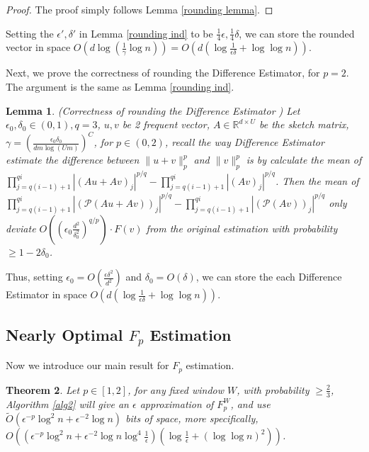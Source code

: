 \documentclass{article}
\newcommand{\dif}{\textsf{Difference Estimator }}
\newcommand{\diff}{\textsf{Difference Estimator}}
\theoremstyle{plain}
\newtheorem{theorem}{Theorem}[section]
\newtheorem{lem}[theorem]{Lemma}
\begin{document}
\begin{proof}
    The proof simply follows Lemma \ref{rounding lemma}.
\end{proof}

Setting the $\epsilon', \delta'$ in Lemma \ref{rounding ind} to be $\frac 14 \epsilon, \frac 14 \delta$, we can store the rounded vector in space $O(d \log (\frac 1\gamma \log n)) = O(d (\log \frac{1}{\epsilon \delta} + \log\log n))$. 

Next, we prove the correctness of rounding the \diff, for $p = 2$. The argument is the same as Lemma \ref{rounding ind}. 

\begin{lem}(Correctness of rounding the \dif) \label{rounding dif}
 Let $\epsilon_0, \delta_0 \in (0, 1), q = 3$, $u, v$ be 2 frequent vector, $A \in \mathbb{R} ^ {d\times U}$ be the sketch matrix, $\gamma = (\frac{\epsilon_0  \delta_0}{dm \log (Um)}) ^ C$, for $p \in (0, 2)$, recall the way \dif estimate the difference between $\|u+v\|_p ^ p$ and $\|v\|_p ^ p$ is by calculate the mean of $\prod_{j=  q(i-1) + 1} ^ {qi} |(Au+Av)_j| ^ {p/q} - \prod_{j=  q(i-1) + 1} ^ {qi} |(Av)_j| ^ {p/q}$.  Then the mean of $\prod_{j=  q(i-1) + 1} ^ {qi} |(\mathcal{P}(Au+Av))_j| ^ {p/q} - \prod_{j=  q(i-1) + 1} ^ {qi} |(\mathcal{P}(Av))_j| ^ {p/q}$ only deviate $O((\epsilon_0 \frac{d ^ 2}{\delta_0 ^ 2}) ^ {q/p})\cdot F(v)$ from the original estimation with probability $\ge 1 - 2\delta_0$. 
    
\end{lem}

Thus, setting $\epsilon_0 = O(\frac{\epsilon \delta ^ 2}{d ^ 2})$ and $\delta_0 = O(\delta)$, we can store the each \dif in space $O(d (\log \frac {1}{\epsilon\delta} + \log\log n))$.  \subsection{Nearly Optimal $F_p$ Estimation}

 
Now we introduce our main result for $F_p$ estimation.

\begin{theorem}\label{main est}
    Let $p\in [1, 2]$, for any fixed window $W$, with probability $\ge \frac 23$, Algorithm \ref{alg2} will give an $\epsilon$ approximation of $F_p ^ {W}$, and  use $\tilde{O}(\epsilon ^ {-p}\log ^ 2n + \epsilon ^ {-2} \log n)$ bits of space, more specifically, $O((\epsilon ^ {-p} \log ^ 2n + \epsilon ^ {-2}\log n \log ^ 4 \frac 1{\epsilon}) (\log \frac{1}{\epsilon} + (\log \log n) ^ 2))$.
\end{theorem}
\end{document}

